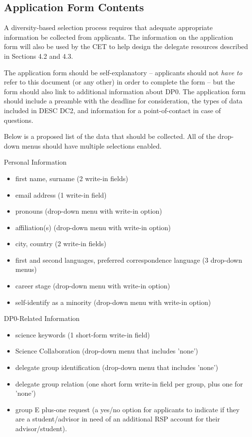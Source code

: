 \documentclass[DM,lsstdraft,authoryear,toc]{lsstdoc}
\begin{document}
\subsection{Application Form Contents}\label{ssec:sel_form}

A diversity-based selection process requires that adequate appropriate information be collected from applicants.
The information on the application form will also be used by the CET to help design the delegate resources described in Sections 4.2 and 4.3. 

The application form should be self-explanatory -- applicants should not \emph{have to} refer to this document (or any other) in order to complete the form -- but the form should also link to additional information about DP0.
The application form should include a preamble with the deadline for consideration, the types of data included in DESC DC2, and information for a point-of-contact in case of questions.

Below is a proposed list of the data that should be collected.
All of the drop-down menus should have multiple selections enabled.

Personal Information
\begin{itemize}
\item first name, surname (2 write-in fields)
\item email address (1 write-in field)
\item pronouns (drop-down menu with write-in option)
\item affiliation(s) (drop-down menu with write-in option)
\item city, country (2 write-in fields)
\item first and second languages, preferred correspondence language (3 drop-down menus)
\item career stage (drop-down menu with write-in option)
\item self-identify as a minority (drop-down menu with write-in option)
\end{itemize}

DP0-Related Information
\begin{itemize}
\item science keywords (1 short-form write-in field)
\item Science Collaboration (drop-down menu that includes 'none')
\item delegate group identification (drop-down menu that includes 'none')
\item delegate group relation (one short form write-in field per group, plus one for 'none')
\item group E plus-one request (a yes/no option for applicants to indicate if they are a student/advisor in need of an additional RSP account for their advisor/student).
\end{itemize}
\end{document}
